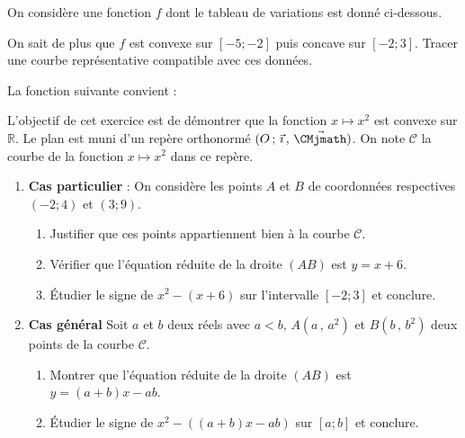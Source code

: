 \documentclass[11pt,fleqn, openany]{book} %
\begin{document}
\begin{exercise}[topic=cvx01]On considère une fonction $f$ dont le tableau de variations est donné ci-dessous.
\begin{center}
\end{center}

On sait de plus que $f$ est convexe sur $[-5;-2]$ puis concave sur $[-2;3]$. Tracer une courbe représentative compatible avec ces données.\end{exercise}

\begin{solution}La fonction suivante convient : 

\begin{center}
\end{center}
\end{solution}




\begin{exercise}[topic=cvx01]L'objectif de cet exercice est de démontrer que la fonction $x\mapsto x^2$ est convexe sur $\mathbb{R}$. Le plan est muni d'un repère orthonormé $\Oij$. On note $\mathcal{C}$ la courbe de la fonction $x\mapsto x^2$ dans ce repère.
\begin{enumerate}
\item \textbf{Cas particulier} : On considère les points $A$ et $B$ de coordonnées respectives $(-2;4)$ et $(3;9)$.
\begin{enumerate}
\item Justifier que ces points appartiennent bien à la courbe $\mathcal{C}$.
\item Vérifier que l'équation réduite de la droite $(AB)$ est $y=x+6$.
\item Étudier le signe de $x^2-(x+6)$ sur l'intervalle $[-2;3]$ et conclure.
\end{enumerate}
\item \textbf{Cas général} Soit $a$ et $b$ deux réels avec $a<b$, $A(a\,,\,a^2)$ et $B(b\,,\,b^2)$ deux points de la courbe $\mathcal{C}$.
\begin{enumerate}
\item Montrer que l'équation réduite de la droite $(AB)$ est $y=(a+b)x-ab$.
\item Étudier le signe de $x^2-((a+b)x-ab)$ sur $[a;b]$ et conclure.
\end{enumerate}
\end{enumerate}\end{exercise}
\end{document}
